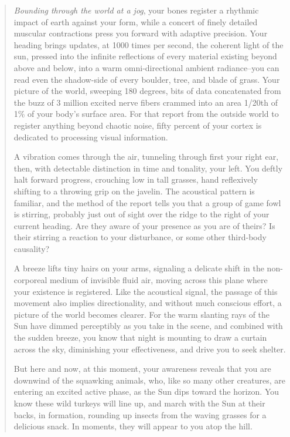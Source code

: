 \documentclass{UIdahoMastersThesis}
\begin{document}
\begin{quote}
{
\textit{Bounding through the world at a jog}, your bones register a rhythmic impact of earth against your form, while a concert of finely detailed muscular contractions press you forward with adaptive precision. Your heading brings updates, at 1000 times per second, the coherent light of the sun, pressed into the infinite reflections of every material existing beyond above and below, into a warm omni-directional ambient radiance--you can read even the shadow-side of every boulder, tree, and blade of grass. Your picture of the world, sweeping 180 degrees, bits of data concatenated from the buzz of 3 million excited nerve fibers crammed into an area 1/20th of 1\% of your body's surface area. For that report from the outside world to register anything beyond chaotic noise, fifty percent of your cortex is dedicated to processing visual information.

A vibration comes through the air, tunneling through first your right ear, then, with detectable distinction in time and tonality, your left. You deftly halt forward progress, crouching low in tall grasses, hand reflexively shifting to a throwing grip on the javelin. The acoustical pattern is familiar, and the method of the report tells you that a group of game fowl is stirring, probably just out of sight over the ridge to the right of your current heading. Are they aware of your presence as you are of theirs? Is their stirring a reaction to your disturbance, or some other third-body causality?

A breeze lifts tiny hairs on your arms, signaling a delicate shift in the non-corporeal medium of invisible fluid air, moving across this plane where your existence is registered. Like the acoustical signal, the passage of this movement also implies directionality, and without much conscious effort, a picture of the world becomes clearer. For the warm slanting rays of the Sun have dimmed perceptibly as you take in the scene, and combined with the sudden breeze, you know that night is mounting to draw a curtain across the sky, diminishing your effectiveness, and drive you to seek shelter.
 
But here and now, at this moment, your awareness reveals that you are downwind of the squawking animals, who, like so many other creatures, are entering an excited active phase, as the Sun dips toward the horizon. You know these wild turkeys will line up, and march with the Sun at their backs, in formation, rounding up insects from the waving grasses for a delicious snack. In moments, they will appear to you atop the hill.
}
\end{quote}
\end{document}
